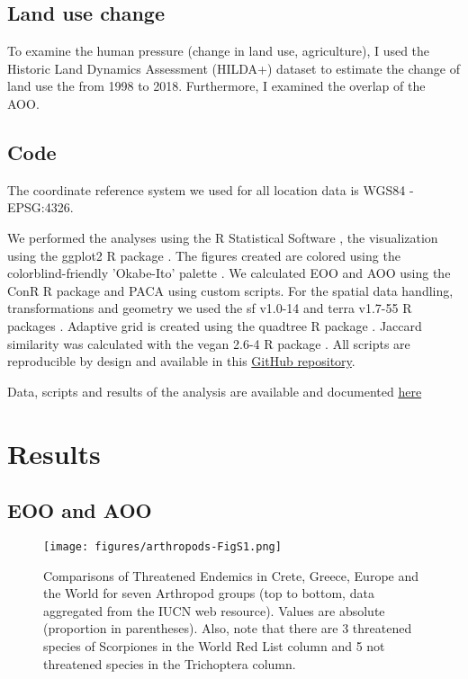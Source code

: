     \subsection{Land use change}
    \label{subsec:arthropods-land-use}
To examine the human pressure (change in land use, agriculture), I used the
Historic Land Dynamics Assessment (HILDA+) dataset \parencite{winkler2021global} to
estimate the change of land use the from 1998 to 2018. Furthermore, I examined
the overlap of the AOO.


    \subsection{Code}
    \label{subsec:arthropods-tools}

The coordinate reference system we used for all location data is WGS84 - EPSG:4326.

We performed the analyses using the R Statistical Software \parencite{rcoreteam},
the visualization using the ggplot2 R package \parencite{wickham_ggplot2_2016}. The figures
created are colored using the colorblind-friendly 'Okabe-Ito' palette \parencite{ichihara2008color}.
We calculated EOO and AOO using the ConR R package \parencite{dauby2017conr:} and PACA
using custom scripts. For the spatial data handling, transformations and
geometry we used the sf v1.0-14 \parencite{pebesma2018simple} and terra v1.7-55 R packages \parencite{hijmans2024terra}.
Adaptive grid is created using the quadtree R package \parencite{friend2023quadtree}.
Jaccard similarity was calculated with the vegan 2.6-4 R package \parencite{oksanen2024vegan}.
All scripts are reproducible by design and available in this 
\href{https://github.com/savvas-paragkamian/arthropoda_assessment_crete}{GitHub repository}.

Data, scripts and results of the analysis are available and documented \href{https://github.com/savvas-paragkamian/arthropods_assessment_crete}{here} 

\section{Results}
\label{sec:arthropods-results}

    \subsection{EOO and AOO}
    \label{subsec:arthropods-sampling}

   \begin{figure}[htp!]
      \centering
      \texttt{[image: figures/arthropods-FigS1.png]}
      \caption[Comparisons of Threatened Endemics in Crete, Greece, Europe and the World]{Comparisons of Threatened Endemics in Crete, Greece, Europe and the World for seven Arthropod groups (top to bottom, data aggregated from the IUCN web resource). Values are absolute (proportion in parentheses). Also, note that there are 3 threatened species of Scorpiones in the World Red List column and 5 not threatened species in the Trichoptera column.}
      \label{fig:arthropods-figS1}
   \end{figure}



